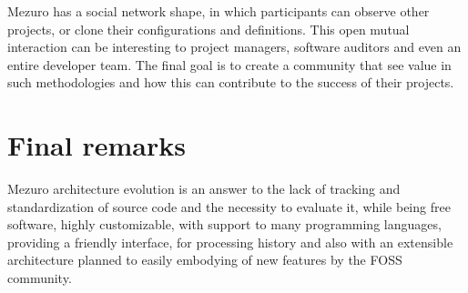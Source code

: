 \documentclass{llncs}
\begin{document}

Mezuro has a social network shape, in which participants can observe other
projects, or clone their configurations and definitions. This open mutual
interaction can be interesting to project managers, software
auditors and even an entire developer team. The final goal is to create a
community that see value in such methodologies and how this can contribute
to the success of their projects.

\section{Final remarks}

Mezuro architecture evolution is an answer to the lack of tracking and standardization
of source code and the necessity to evaluate it, while being free software,
highly customizable, with support to many programming languages, providing
a friendly interface, for processing history and also with an extensible
architecture planned to easily embodying of new features by the FOSS community.




\end{document}
